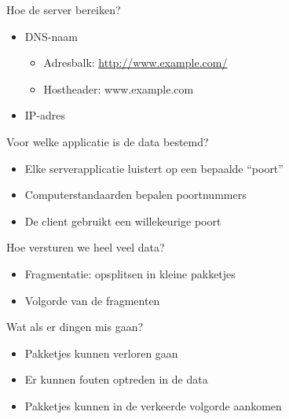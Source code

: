 


\begin{frame}{Hoe de server bereiken?}
\begin{itemize}
\item<1-> DNS-naam
    \begin{itemize}
    \item Adresbalk: \url{http://www.example.com/}
    \item Hostheader: www.example.com
    \end{itemize}
\item<2-> IP-adres
\end{itemize}
\end{frame}



\begin{frame}{Voor welke applicatie is de data bestemd?}
\begin{itemize}
\item Elke serverapplicatie luistert op een bepaalde ``poort''
\item Computerstandaarden bepalen poortnummers
\item De client gebruikt een willekeurige poort
\end{itemize}
\end{frame}



\begin{frame}{Hoe versturen we heel veel data?}
\begin{itemize}
\item Fragmentatie: opsplitsen in kleine pakketjes
\item Volgorde van de fragmenten
\end{itemize}
\end{frame}



\begin{frame}{Wat als er dingen mis gaan?}
\begin{itemize}
\item Pakketjes kunnen verloren gaan
\item Er kunnen fouten optreden in de data
\item Pakketjes kunnen in de verkeerde volgorde aankomen
\end{itemize}
\end{frame}



